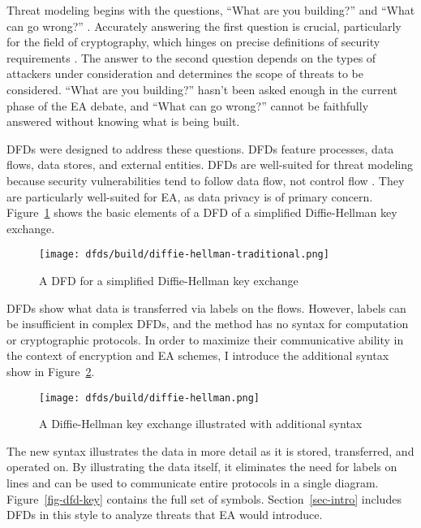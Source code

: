\documentclass[manuscript,screen,review]{acmart}
\newcommand{\myfig}[1]{Figure~\ref{#1}}
\newcommand{\mysec}[1]{Section~\ref{#1}}
\begin{document}
Threat modeling begins with the questions, ``What are you building?'' and ``What can go wrong?''
\cite{shostack_threat_2014}. Accurately answering the first question is crucial, particularly for the field of
cryptography, which hinges on precise definitions of security requirements \cite{varia_2018}. The answer to the second
question depends on the types of attackers under consideration and determines the scope of threats to be considered.
``What are you building?'' hasn't been asked enough in the current phase of the \ac{EA} debate, and ``What can go
wrong?'' cannot be faithfully answered without knowing what is being built.

\Acp{DFD} were designed to address these questions. \Acp{DFD} feature processes, data flows, data stores, and external
entities. \Acp{DFD} are well-suited for threat modeling because security vulnerabilities tend to follow data flow, not
control flow \cite{shostack_threat_2014}. They are particularly well-suited for \ac{EA}, as data privacy is of primary
concern. \myfig{fig-dfd-dh-traditional} shows the basic elements of a \ac{DFD} of a simplified Diffie-Hellman key
exchange.

\begin{figure}[h]
    \centering
    \texttt{[image: dfds/build/diffie-hellman-traditional.png]}
    \caption{A \acs{DFD} for a simplified Diffie-Hellman key exchange}
    \label{fig-dfd-dh-traditional}
\end{figure}

\Acp{DFD} show what data is transferred via labels on the flows. However, labels can be insufficient in complex
\acp{DFD}, and the method has no syntax for computation or cryptographic protocols. In order to maximize their
communicative ability in the context of encryption and \acl{EA} schemes, I introduce the additional syntax show in
\myfig{fig-dfd-dh-updated}.

\begin{figure}[h]
    \centering
    \texttt{[image: dfds/build/diffie-hellman.png]}
    \caption{A Diffie-Hellman key exchange illustrated with additional syntax}
    \label{fig-dfd-dh-updated}
\end{figure}

The new syntax illustrates the data in more detail as it is stored, transferred, and operated on. By illustrating the
data itself, it eliminates the need for labels on lines and can be used to communicate entire protocols in a single
diagram. \myfig{fig-dfd-key} contains the full set of symbols. \mysec{sec-intro} includes \acp{DFD} in this style to
analyze threats that EA would introduce.
\end{document}
